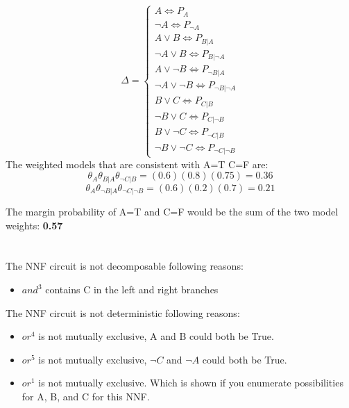 \documentclass{article}
\begin{document}
 \section{}
 \[ \Delta = \begin{cases} 
      A \iff P_{A} \\
      \lnot A \iff P_{\lnot A} \\
      A \lor B \iff P_{B|A} \\
      \lnot A \lor B \iff P_{B|\lnot A} \\
      A \lor \lnot B \iff P_{\lnot B|A} \\
      \lnot A \lor \lnot B \iff P_{\lnot B|\lnot A} \\
      B \lor C \iff P_{C|B} \\
      \lnot B \lor C \iff P_{C|\lnot B} \\
      B \lor \lnot C \iff P_{\lnot C|B} \\
      \lnot B \lor \lnot C \iff P_{\lnot C|\lnot B}
   \end{cases}
\]
The weighted models that are consistent with A=T C=F are:
\[\theta_{A}\theta_{B|A}\theta_{\lnot C|B} = (0.6)(0.8)(0.75) = 0.36\]
\[\theta_{A}\theta_{\lnot B|A}\theta_{\lnot C|\lnot B} = (0.6)(0.2)(0.7) = 0.21\]

The margin probability of A=T and C=F would be the sum of the two model weights: \textbf{0.57}
 \clearpage
 \section{}
The NNF circuit is not decomposable following reasons:
\begin{itemize}
    \item $and^{3}$ contains C in the left and right branches
\end{itemize}
The NNF circuit is not deterministic following reasons:
\begin{itemize}
 \item $or^{4}$ is not mutually exclusive, A and B could both be True.
 \item $or^{5}$ is not mutually exclusive, $\lnot C$ and $\lnot A$ could both be True.
 \item $or^{1}$ is not mutually exclusive. Which is shown if you enumerate possibilities for A, B, and C for this NNF.
\end{itemize}
 \clearpage
\end{document}
